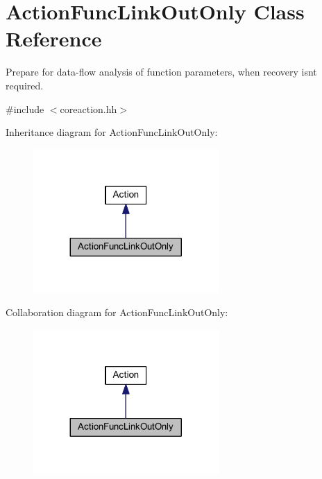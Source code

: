 \hypertarget{class_action_func_link_out_only}{}\section{Action\+Func\+Link\+Out\+Only Class Reference}
\label{class_action_func_link_out_only}


Prepare for data-\/flow analysis of function parameters, when recovery isn\textquotesingle{}t required.  




{\ttfamily \#include $<$coreaction.\+hh$>$}



Inheritance diagram for Action\+Func\+Link\+Out\+Only\+:
\nopagebreak
\begin{figure}[H]
\begin{center}
\leavevmode
\includegraphics[width=200pt]{class_action_func_link_out_only__inherit__graph}
\end{center}
\end{figure}


Collaboration diagram for Action\+Func\+Link\+Out\+Only\+:
\nopagebreak
\begin{figure}[H]
\begin{center}
\leavevmode
\includegraphics[width=200pt]{class_action_func_link_out_only__coll__graph}
\end{center}
\end{figure}
